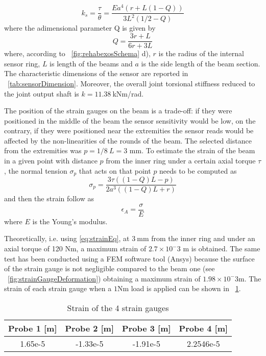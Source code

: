 \begin{equation}
\label{eqn:sensorStiffness}
k_{s} = \frac{\tau}{\theta} = \frac{Ea^4(r+L(1-Q))}{3L^2(1/2-Q)}	
\end{equation}
where the adimensional parameter Q is given by
\begin{equation}
\label{eqn:adimensionalQ}
Q = \frac{3r+L}{6r+3L}	
\end{equation}
where, according to \figurename \ \ref{fig:rehabexosSchema} d), %
$r$ is the radius of the internal sensor ring, $L$ is length of the beams and $a$ is the side length of the beam section.
The characteristic dimensions of the sensor are reported in \tablename \ \ref{tab:sensorDimension}.
Moreover, the overall joint torsional stiffness reduced to the joint output shaft is $k = 11.38\ $kNm/rad.
\par The position of the strain gauges on the beam is a trade-off: if they were positioned in the middle of the beam the sensor sensitivity would be low, on the contrary, if they were positioned near the extremities the sensor reads would be affected by the non-linearities of the rounds of the beam. The selected distance from the extremities was $p = 1/8 \ L = 3$ mm.
To estimate the strain of the beam in a given point with distance $p$ from the inner ring under a certain axial torque $\tau$, the normal tension $\sigma_p$ that acts on that point $p$ needs to be computed as
\begin{equation}
\label{eqn:normalTensionOnBeam}
\sigma_p = \frac{3\tau((1-Q)L-p)}{2a^3((1-Q)L+r)}	
\end{equation}
and then the strain follow as 
\begin{equation}
\label{eq:strainEq}
\epsilon_A= \frac{\sigma}{E}
\end{equation} 
where $E$ is the Young's modulus.
\par Theoretically, i.e. using \eqref{eq:strainEq}, at $3 \ $mm  from the inner ring and under an axial torque of 120 Nm,  a maximum strain of $2.7\times 10^-3 $ m is obtained.
The same test has been conducted using a FEM software tool (Ansys\textregistered) because the surface of the strain gauge is not negligible compared to the beam one (see \figurename \ \ref{fig:strainGaugeDeformation}) obtaining a maximum strain of $1.98 \times 10^-3 $m.
The strain of each strain gauge when a $1 $Nm load is applied can be shown in \tablename \ \ref{tab:sensorStrain}.
\begin{table}[]
	\renewcommand{\arraystretch}{1.3}
	\caption{Strain of the 4 strain gauges}
	\label{tab:sensorStrain}
	\centering
	\begin{tabular}{c c c c}
		\hline \hline
		\bfseries Probe 1 [m] & \bfseries Probe 2 [m] & \bfseries Probe 3 [m] & \bfseries Probe 4 [m]\\
		\hline
		1.65e-5  & -1.33e-5 & -1.91e-5 & 2.2546e-5\\
		\hline \hline
	\end{tabular}
\end{table} 
